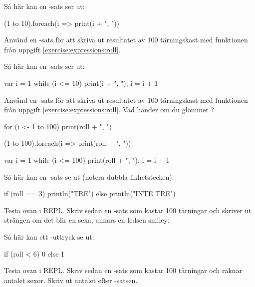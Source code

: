 \Subtask Så här kan en -sats ser ut:
\begin{Code}
(1 to 10).foreach(i => print(i + ", "))
\end{Code}
Använd en -sats för att skriva ut resultatet av 100 tärningskast med funktionen  från uppgift \ref{exercise:expressions:roll}.

\Subtask Så här kan en -sats ser ut:
\begin{Code}
var i = 1
while (i <= 10) { print(i + ", "); i = i + 1 }
\end{Code}
Använd en -sats för att skriva ut resultatet av 100 tärningskast med funktionen  från uppgift \ref{exercise:expressions:roll}. Vad händer om du glömmer  ?


\SOLUTION

\TaskSolved \what

\SubtaskSolved
\begin{Code}
for (i <- 1 to 100) print(roll + ", ")
\end{Code}

\SubtaskSolved
\begin{Code}
(1 to 100).foreach(i => print(roll + ", "))
\end{Code}


\SubtaskSolved
\begin{Code}
var i = 1
while (i <= 100) { print(roll + ", "); i = i + 1 }
\end{Code}




\QUESTEND







\QUESTBEGIN

\Task \what

\Subtask Så här kan en -sats se ut (notera dubbla likhetstecken):
\begin{Code}
if (roll == 3) println("TRE") else println("INTE TRE")
\end{Code}
Testa ovan i REPL. Skriv sedan en -sats som kastar 100 tärningar och skriver ut strängen  om det blir en sexa, annars en ledsen smiley: 

\Subtask Så här kan ett -uttryck se ut:
\begin{Code}
if (roll < 6) 0 else 1
\end{Code}
Testa ovan i REPL. Skriv sedan en -sats som kastar 100 tärningar och räknar antalet sexor. Skriv ut antalet efter -satsen.

